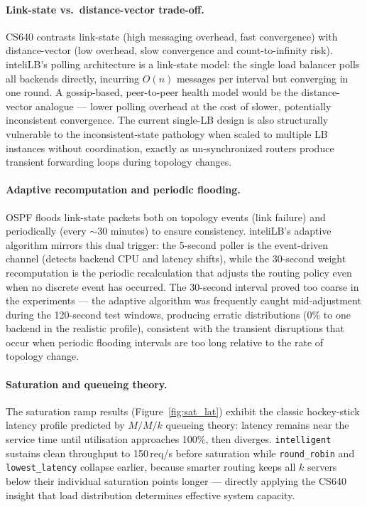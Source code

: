 \documentclass[12pt]{article}
\begin{document}
\paragraph{Link-state vs.\ distance-vector trade-off.}
CS640 contrasts link-state (high messaging overhead, fast convergence) with
distance-vector (low overhead, slow convergence and count-to-infinity risk).
inteliLB's polling architecture is a link-state model: the single load balancer
polls all backends directly, incurring $O(n)$ messages per interval but
converging in one round. A gossip-based, peer-to-peer health model would be the
distance-vector analogue — lower polling overhead at the cost of slower,
potentially inconsistent convergence. The current single-LB design is also
structurally vulnerable to the inconsistent-state pathology when scaled to
multiple LB instances without coordination, exactly as un-synchronized routers
produce transient forwarding loops during topology changes.

\paragraph{Adaptive recomputation and periodic flooding.}
OSPF floods link-state packets both on topology events (link failure) and
periodically (every $\sim$30 minutes) to ensure consistency. inteliLB's
adaptive algorithm mirrors this dual trigger: the 5-second poller is the
event-driven channel (detects backend CPU and latency shifts), while the
30-second weight recomputation is the periodic recalculation that adjusts
the routing policy even when no discrete event has occurred. The 30-second
interval proved too coarse in the experiments — the adaptive algorithm was
frequently caught mid-adjustment during the 120-second test windows, producing
erratic distributions (0\% to one backend in the realistic profile), consistent
with the transient disruptions that occur when periodic flooding intervals are
too long relative to the rate of topology change.

\paragraph{Saturation and queueing theory.}
The saturation ramp results (Figure~\ref{fig:sat_lat}) exhibit the classic
hockey-stick latency profile predicted by $M/M/k$ queueing theory: latency
remains near the service time until utilisation approaches 100\%, then diverges.
\texttt{intelligent} sustains clean throughput to 150\,req/s before saturation
while \texttt{round\_robin} and \texttt{lowest\_latency} collapse earlier,
because smarter routing keeps all $k$ servers below their individual saturation
points longer — directly applying the CS640 insight that load distribution
determines effective system capacity.
\end{document}
